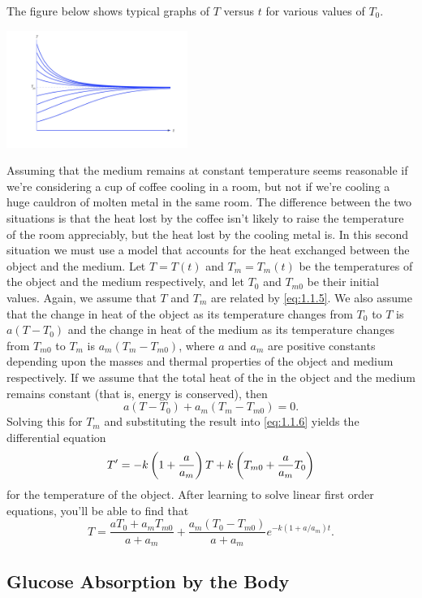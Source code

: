 \documentclass{ximera}
\begin{document}
The figure below shows typical graphs of $T$ versus $t$ for
various values of  $T_0$.
 
\begin{image}
\includegraphics[height=1.5in]{fig010102.jpg}
\end{image}

 
Assuming that the medium remains at constant temperature seems
reasonable if we're considering a cup of coffee cooling in a room, but
 not if we're cooling a huge cauldron of molten
metal in the same room. The difference between the two situations is
that the heat lost by the coffee isn't likely to raise the
temperature of the room appreciably, but the heat lost by the
cooling metal is. In this second situation we must use a model that
accounts for the heat exchanged between the object and the medium. Let
$T=T(t)$ and $T_m=T_m(t)$ be the temperatures of the object and the
medium respectively, and let $T_0$ and $T_{m0}$ be their initial
values. Again, we assume that $T$ and $T_m$ are related by
\eqref{eq:1.1.5}. We also assume that the change in heat of
the object as its temperature changes from $T_0$ to $T$ is $a(T-T_0)$
and  the change in heat of the medium as its temperature changes
from $T_{m0}$ to $T_m$ is $a_m(T_m-T_{m0})$, where $a$ and $a_m$ are
positive constants depending upon the masses and thermal properties of
the object and medium respectively. If we assume that the total heat
of the in the object and the medium remains constant
(that is, energy is conserved), then
$$
a(T-T_0)+a_m(T_m-T_{m0})=0.
$$
Solving this for  $T_m$  and substituting the result into
\eqref{eq:1.1.6} yields the differential equation
$$
T'=-k\left(1+{a\over a_m}\right)T
+k\left(T_{m0}+{a\over a_m}T_0\right)
$$
for the temperature of the object.  After learning to solve linear
first order  equations, you'll be able to find that
$$
T=\frac{aT_0+a_mT_{m0}}
{a+a_m}+\frac{a_m(T_0-T_{m0})}{a+a_m}e^{-k(1+a/a_m)t}.
$$
 
\subsection*{Glucose Absorption by the Body}
 
\end{document}
